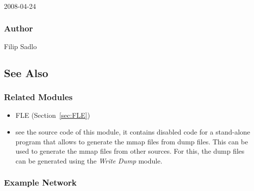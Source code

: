 2008-04-24


\subsubsection{Author}

Filip Sadlo


\subsection{See Also}


\subsubsection{Related Modules}

\begin{itemize}

\item
  FLE (Section~\ref{sec:FLE})

\item
  see the source code of this module, it contains disabled code for a stand-alone program that allows to generate the mmap files from dump files. This can be used to generate the mmap files from other sources. For this, the dump files can be generated using the \emph{Write Dump} module.

\end{itemize}


\subsubsection{Example Network}

